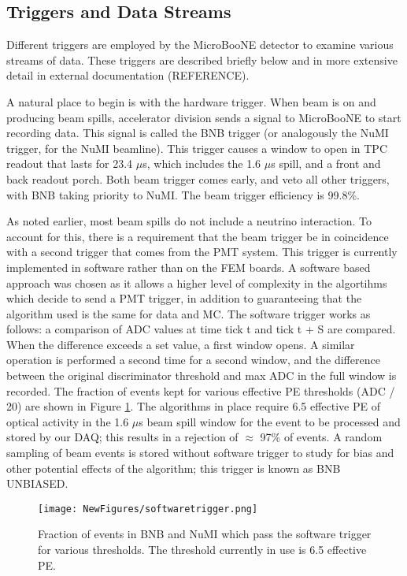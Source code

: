 \documentclass[12pt]{article}
\begin{document}
\subsection{Triggers and Data Streams}
\par Different triggers are employed by the MicroBooNE detector to examine various streams of data. These triggers are described briefly below and in more extensive detail in external documentation (REFERENCE).
\par A natural place to begin is with the hardware trigger.  When beam is on and producing beam spills, accelerator division sends a signal to MicroBooNE to start recording data. This signal is called the BNB trigger (or analogously the NuMI trigger, for the NuMI beamline).  This trigger causes a window to open in TPC readout that lasts for 23.4 $\mu$s, which includes the 1.6 $\mu$s spill, and a front and back readout porch.  Both beam trigger comes early, and veto all other triggers, with BNB taking priority to NuMI.  The beam trigger efficiency is 99.8\%. %
\par As noted earlier, most beam spills do not include a neutrino interaction. To account for this, there is a requirement that the beam trigger be in coincidence with a second trigger that comes from the PMT system. This trigger is currently implemented in software rather than on the FEM boards.  A software based approach was chosen as it allows a higher level of complexity in the algortihms which decide to send a PMT trigger, in addition to guaranteeing that the algorithm used is the same for data and MC.  The software trigger works as follows: a comparison of ADC values at time tick t and tick t + S are compared.  When the difference exceeds a set value, a first window opens. A similar operation is performed a second time for a second window, and the difference between the original discriminator threshold and max ADC in the full window is recorded. The fraction of events kept for various effective PE thresholds (ADC / 20) are shown in Figure \ref{fig:swtrigger}.  The algorithms in place require 6.5 effective PE of optical activity in the 1.6 $\mu$s beam spill window for the event to be processed and stored by our DAQ; this results in a rejection of $\approx$ 97\% of events. A random sampling of beam events is stored without software trigger to study for bias and other potential effects of the algorithm; this trigger is known as BNB UNBIASED. 

\begin{figure}[h!]
\centering
\texttt{[image: NewFigures/softwaretrigger.png]}
\caption{ Fraction of events in BNB and NuMI which pass the software trigger for various thresholds. The threshold currently in use is 6.5 effective PE.  } 
\label{fig:swtrigger}
\end{figure}
\end{document}
